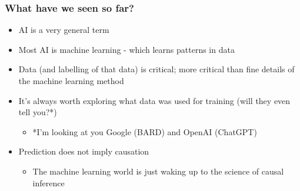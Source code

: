 \begin{frame}
\frametitle{What have we seen so far?}
\begin{itemize}
    \setlength{\itemsep}{2mm}
    \item AI is a very general term
    \item Most AI is machine learning - which learns patterns in data
    \item Data (and labelling of that data) is critical; more critical than fine details of the machine learning method
    \item It's always worth exploring what data was used for training (will they even tell you?*)  
    \begin{itemize}
        \item *I'm looking at you Google (BARD) and OpenAI (ChatGPT)
    \end{itemize}
    \item Prediction does not imply causation
    \begin{itemize}
        \item The machine learning world is just waking up to the science of causal inference
    \end{itemize}
\end{itemize}

\end{frame}